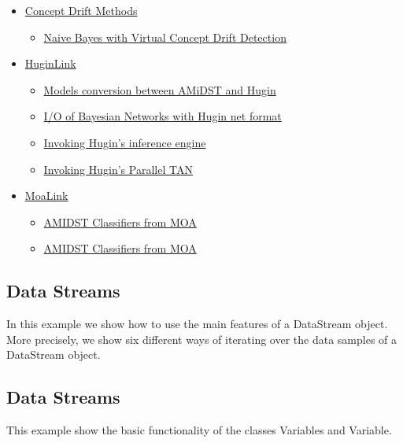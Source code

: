 \documentclass[10pt,a4paper]{article}
\begin{document}
\begin{itemize}
\item \hyperref[sec:bns:conceptdrift]{Concept Drift Methods}
\begin{itemize}
	\item \hyperref[sec:bns:conceptdrift:nbayes]{Naive Bayes with Virtual Concept Drift Detection}
\end{itemize}

\item \hyperref[sec:bns:huginlink]{HuginLink}
\begin{itemize}
	\item \hyperref[sec:bns:huginlink:conversion]{Models conversion between AMiDST and Hugin}
	\item \hyperref[sec:bns:huginlink:io]{I/O of Bayesian Networks with Hugin net format}
	\item \hyperref[sec:bns:huginlink:inference]{Invoking Hugin's inference engine}
	\item \hyperref[sec:bns:huginlink:huginTAN]{Invoking Hugin's Parallel TAN}
\end{itemize}



\item \hyperref[sec:bns:moalink]{MoaLink}
\begin{itemize}
	\item \hyperref[sec:bns:moalink:moaclass]{AMIDST Classifiers from MOA}
	\item \hyperref[sec:bns:moalink:moareg]{AMIDST Classifiers from MOA}
\end{itemize}

\end{itemize}


\subsection{Data Streams}\label{sec:bns:datastreams}

In this example we show how to use the main features of a DataStream object. More precisely, we show six different ways of iterating over the data samples of a DataStream object.



\subsection{Data Streams}\label{sec:bns:randomvars}

This example show the basic functionality of the classes Variables and Variable.
\end{document}
